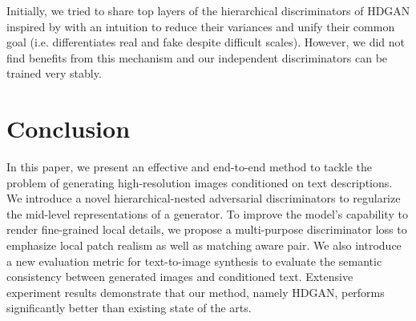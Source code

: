 \documentclass[10pt,twocolumn,letterpaper]{article}
\begin{document}
Initially, we tried to share top layers of the hierarchical discriminators of HDGAN inspired by \cite{liu2017unsupervised} with an intuition to reduce their variances and unify their common goal (i.e. differentiates real and fake despite difficult scales). However, we did not find benefits from this mechanism and our independent discriminators can be trained very stably. 

%


\section{Conclusion}
In this paper, we present an effective and end-to-end method to tackle the problem of generating high-resolution images conditioned on text descriptions. We introduce a novel hierarchical-nested adversarial discriminators to regularize the mid-level representations of a generator. To improve the model's capability to render fine-grained local details, we propose a multi-purpose discriminator loss to emphasize local patch realism as well as matching aware pair. We also introduce a new evaluation metric for text-to-image synthesis to evaluate the semantic consistency between generated images and conditioned text.
Extensive experiment results demonstrate that our method, namely HDGAN, performs significantly better than existing state of the arts.


{\small


}
\end{document}
